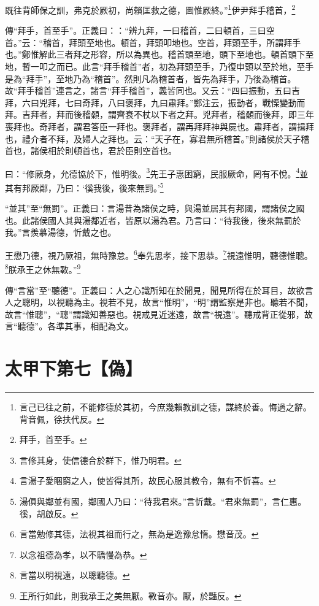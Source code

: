 既往背師保之訓，弗克於厥初，尚賴匡救之德，圖惟厥終。”\footnote{言己已往之前，不能修德於其初，今庶幾賴教訓之德，謀終於善。悔過之辭。背音佩，徐扶代反。}伊尹拜手稽首，\footnote{拜手，首至手。}

{\noindent\zhuan{}\fzbyks 傳“拜手，首至手”。正義曰：：“辨九拜，一曰稽首，二曰頓首，三曰空首。”云：“稽首，拜頭至地也。頓首，拜頭叩地也。空首，拜頭至手，所謂拜手也。”鄭惟解此三者拜之形容，所以為異也。稽首頭至地，頭下至地也。頓首頭下至地，暫一叩之而已。此言“拜手稽首”者，初為拜頭至手，乃復申頭以至於地，至手是為“拜手”，至地乃為“稽首”。然則凡為稽首者，皆先為拜手，乃後為稽首。故“拜手稽首”連言之，諸言“拜手稽首”，義皆同也。又云：“四曰振動，五曰吉拜，六曰兇拜，七曰奇拜，八曰褒拜，九曰肅拜。”鄭注云，振動者，戰慄變動而拜。吉拜者，拜而後稽顙，謂齊衰不杖以下者之拜。兇拜者，稽顙而後拜，即三年喪拜也。奇拜者，謂君答臣一拜也。褒拜者，謂再拜拜神與屍也。肅拜者，謂揖拜也，禮介者不拜，及婦人之拜也。云：“天子在，寡君無所稽首。”則諸侯於天子稽首也，諸侯相於則頓首也，君於臣則空首也。 \par}

曰：“修厥身，允德協於下，惟明後。\footnote{言修其身，使信德合於群下，惟乃明君。}先王子惠困窮，民服厥命，罔有不悅。\footnote{言湯子愛睏窮之人，使皆得其所，故民心服其教令，無有不忻喜。}並其有邦厥鄰，乃曰：‘徯我後，後來無罰。’\footnote{湯俱與鄰並有國，鄰國人乃曰：“待我君來。”言忻戴。“君來無罰”，言仁惠。徯，胡啟反。}

{\noindent\shu{}\fzkt “並其”至“無罰”。正義曰：言湯昔為諸侯之時，與湯並居其有邦國，謂諸侯之國也。此諸侯國人其與湯鄰近者，皆原以湯為君。乃言曰：“待我後，後來無罰於我。”言羨慕湯德，忻戴之也。 \par}

王懋乃德，視乃厥祖，無時豫怠。\footnote{言當勉修其德，法視其祖而行之，無為是逸豫怠惰。懋音茂。}奉先思孝，接下思恭。\footnote{以念祖德為孝，以不驕慢為恭。}視遠惟明，聽德惟聰。\footnote{言當以明視遠，以聰聽德。}朕承王之休無斁。”\footnote{王所行如此，則我承王之美無厭。斁音亦。厭，於豔反。}

{\noindent\zhuan{}\fzbyks 傳“言當”至“聽德”。正義曰：人之心識所知在於聞見，聞見所得在於耳目，故欲言人之聰明，以視聽為主。視若不見，故言“惟明”，“明”謂監察是非也。聽若不聞，故言“惟聰”，“聰”謂識知善惡也。視戒見近迷遠，故言“視遠”。聽戒背正從邪，故言“聽德”。各準其事，相配為文。 \par}

\section{太甲下第七【偽】}



